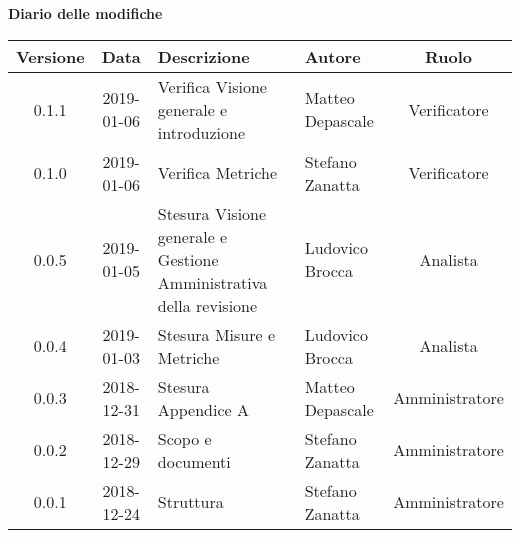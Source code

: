 	\begin{center}
		\textbf{Diario delle modifiche}
	\end{center}
	\begin{center}
		\begin{tabularx}{\textwidth}{|c|c|X|X|c|}
			\hline
			\textbf{Versione} & \textbf{Data} & \textbf{Descrizione} & \textbf{Autore} & \textbf{Ruolo} \\
			\hline
			0.1.1 & 2019-01-06 & Verifica Visione generale e introduzione & Matteo Depascale & Verificatore\\
			\hline
			0.1.0 & 2019-01-06 & Verifica Metriche & Stefano Zanatta & Verificatore\\
			\hline
			0.0.5 & 2019-01-05 & Stesura Visione generale e Gestione Amministrativa della revisione  & Ludovico Brocca& Analista\\
			\hline	
			0.0.4 & 2019-01-03& Stesura Misure e Metriche &Ludovico Brocca & Analista\\
			\hline
			0.0.3 & 2018-12-31 & Stesura Appendice A & Matteo Depascale & Amministratore\\
			\hline
			0.0.2 & 2018-12-29 & Scopo e documenti & Stefano Zanatta & Amministratore\\
			\hline
			0.0.1 & 2018-12-24 & Struttura & Stefano Zanatta & Amministratore\\
			\hline
		\end{tabularx}
	\end{center}
\newpage